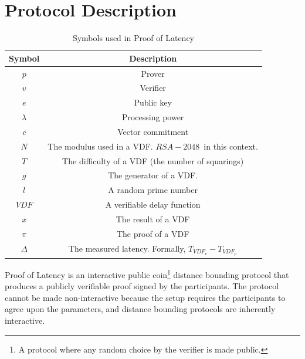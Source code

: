 \section{Protocol Description}
\begin{table}[h!]
	\centering
	\begin{tabular}{ c|c  }
		Symbol        & Description                                             \\
		\hline
		\( p \)       & Prover                                                  \\
		\( v \)       & Verifier                                                \\
		\( e \)      & Public key                                              \\
		\( \lambda \) & Processing power                                        \\
		\( c \)       & Vector commitment                                       \\
		\( N \)       & The modulus used in a VDF. \(RSA-2048\)~in this context.   \\

		\( T \)       & The difficulty of a VDF (the number of squarings)       \\
		\( g \)       & The generator of a VDF.                                 \\
		\( l \)       & A random prime number                                   \\
		\( VDF \)     & A verifiable delay function                             \\
		\( x \)       & The result of a VDF                                     \\
		\(\pi \)      & The proof of a VDF                                      \\
		\(\Delta\)    & The measured latency. Formally, \(T_{VDF_v} - T_{VDF_p}\) \\
	\end{tabular}
	\caption{Symbols used in Proof of Latency}
	\label{table:1}
\end{table}

Proof of Latency is an interactive public coin\footnote{A protocol where any random choice by the verifier is made public.} distance bounding protocol that produces a publicly verifiable proof signed by the participants. The protocol cannot be made non-interactive because the setup requires the participants to agree upon the parameters, and distance bounding protocols are inherently interactive.

